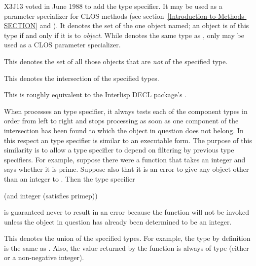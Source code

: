 \begin{newer}
\begin{flushdesc}
\item[\cd{(eql {\it object})}]
X3J13 voted in June 1988  to add the  type specifier.
It may be used as a parameter specializer for CLOS methods
(see section~\ref{Introduction-to-Methods-SECTION}
and ).
It denotes the set of the one object named;  an object is of
this type if and only if it is  to {\it object}.  While
 denotes the same type as ,
only  may be used as a CLOS parameter specializer.
\end{flushdesc}
\end{newer}

\begin{flushdesc}
\item[\cd{(not {\it type})}]
This denotes the set of all those objects that
are {\it not} of the specified type.

\item[\cd{(and {\it type1} {\it type2} ...)}]
This denotes the intersection of
the specified types.

\beforenoterule
\begin{incompatibility}
This is roughly equivalent to
the Interlisp DECL package's .
\end{incompatibility}
\afternoterule

When  processes an  type specifier, it always
tests each of the component types in order from left to right
and stops processing as soon as one component of the intersection has
been found to which the object in question does not belong.
In this respect an  type specifier is similar to an
executable  form.  The purpose of this similarity is to allow
a  type specifier to depend on filtering by previous
type specifiers.  For example, suppose there were a function 
that takes an integer and says whether it is prime.  Suppose also that
it is an error to give any object other than an integer to .
Then the type specifier
\begin{lisp}
(and integer (satisfies primep))
\end{lisp}
is guaranteed never to result in an error because the function 
will not be invoked unless the object in question has already been
determined to be an integer.

\item[\cd{(or {\it type1} {\it type2} ...)}]
This denotes the union of the
specified types.  For example, the type  by definition is the same as
.  Also, the value returned by the function
 is always of type 
(either {\nil} or a non-negative integer).


\end{flushdesc}
